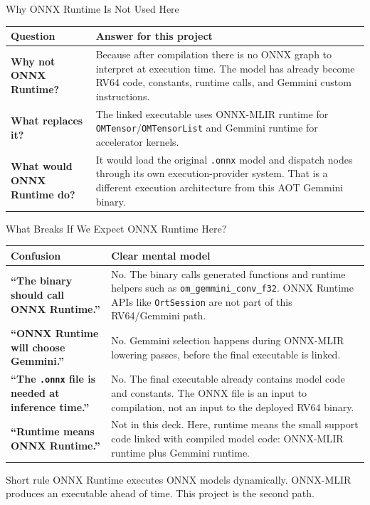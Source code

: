 \documentclass[aspectratio=169,10pt]{beamer}
\newcommand{\code}[1]{\texttt{\footnotesize #1}}
\newcommand{\edgeword}[1]{\textcolor{red!75!black}{\textbf{#1}}}
\begin{document}
\begin{frame}{Why ONNX Runtime Is Not Used Here}
  \vspace{0.55em}
  \scriptsize
  \begin{tabularx}{\textwidth}{@{}lX@{}}
    \toprule
    Question & Answer for this project \\
    \midrule
    \edgeword{Why not ONNX Runtime?} &
      Because after compilation there is no ONNX graph to interpret at execution time. The model has already become RV64 code, constants, runtime calls, and Gemmini custom instructions. \\
    \edgeword{What replaces it?} &
      The linked executable uses ONNX-MLIR runtime for \code{OMTensor}/\code{OMTensorList} and Gemmini runtime for accelerator kernels. \\
    \edgeword{What would ONNX Runtime do?} &
      It would load the original \code{.onnx} model and dispatch nodes through its own execution-provider system. That is a different execution architecture from this AOT Gemmini binary. \\
    \bottomrule
  \end{tabularx}
\end{frame}

\begin{frame}{What Breaks If We Expect ONNX Runtime Here?}
  \scriptsize
  \begin{tabularx}{\textwidth}{@{}lX@{}}
    \toprule
    Confusion & Clear mental model \\
    \midrule
    \edgeword{``The binary should call ONNX Runtime.''} &
      No. The binary calls generated functions and runtime helpers such as \code{om\_gemmini\_conv\_f32}. ONNX Runtime APIs like \code{OrtSession} are not part of this RV64/Gemmini path. \\
    \edgeword{``ONNX Runtime will choose Gemmini.''} &
      No. Gemmini selection happens during ONNX-MLIR lowering passes, before the final executable is linked. \\
    \edgeword{``The \code{.onnx} file is needed at inference time.''} &
      No. The final executable already contains model code and constants. The ONNX file is an input to compilation, not an input to the deployed RV64 binary. \\
    \edgeword{``Runtime means ONNX Runtime.''} &
      Not in this deck. Here, runtime means the small support code linked with compiled model code: ONNX-MLIR runtime plus Gemmini runtime. \\
    \bottomrule
  \end{tabularx}

  \vspace{0.55em}
  \begin{block}{Short rule}
    ONNX Runtime executes ONNX models dynamically. ONNX-MLIR produces an executable ahead of time. This project is the second path.
  \end{block}
\end{frame}
\end{document}
